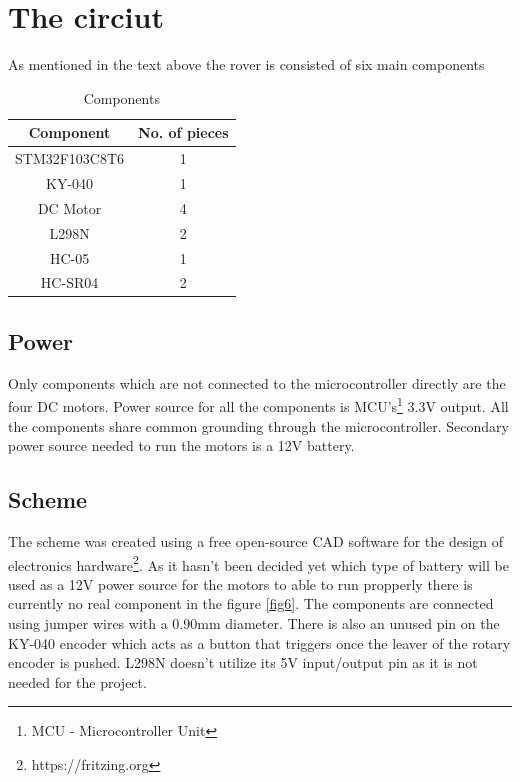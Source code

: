 \section{The circiut}

As mentioned in the text above the rover is consisted of six main components

\begin{table}[htbp]
    \caption{Components}
    \begin{center}
        \begin{tabular}{|c|c|}
            \hline
            \textbf{Component} & \textbf{No. of pieces}\\
            \hline
            STM32F103C8T6 & 1\\
            \hline
            KY-040 & 1\\
            \hline
            DC Motor & 4\\
            \hline
            L298N & 2\\
            \hline
            HC-05 & 1\\
            \hline
            HC-SR04 & 2\\
            \hline
        \end{tabular}
        \label{tab3}
    \end{center}
\end{table}

\subsection{Power}
Only components which are not connected to the microcontroller directly are the four DC motors. Power source for all the components is MCU's\footnote{MCU - Microcontroller Unit} 3.3V output. All the components share common grounding through the microcontroller. Secondary power source needed to run the motors is a 12V battery. 

\subsection{Scheme}

The scheme was created using a free open-source CAD software for the design of electronics hardware\footnote{https://fritzing.org}. As it hasn't been decided yet which type of battery will be used as a 12V power source for the motors to able to run propperly there is currently no real component in the figure \ref{fig6}. The components are connected using jumper wires with a 0.90mm diameter.
There is also an unused pin on the KY-040 encoder which acts as a button that triggers once the leaver of the rotary encoder is pushed\cite{KY-040}. L298N doesn't utilize its 5V input/output pin as it is not needed for the project.

